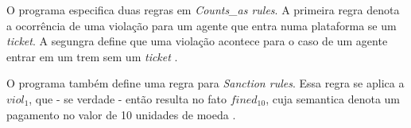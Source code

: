 O programa especifica duas regras em \textit{Counts\_as rules}. A primeira regra denota a ocorrência de uma violação para um agente que entra numa plataforma se um \textit{ticket}. A segungra
define que uma violação acontece para o caso de um agente entrar em um trem sem um \textit{ticket} \cite{dastaniframework}.

O programa também define uma regra para \textit{Sanction rules}. Essa regra se aplica a $viol_1$, que - se verdade - então resulta no fato $fined_{10}$, cuja semantica denota um pagamento no 
valor de 10 unidades de moeda \cite{dastaniframework}.  
